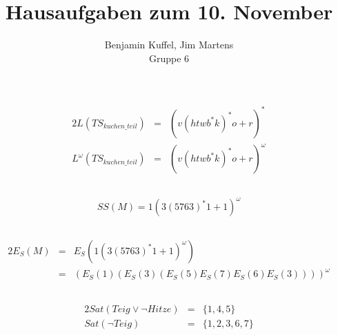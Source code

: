 \documentclass[10pt,a4paper,oneside,ngerman,numbers=noenddot]{scrartcl}
\begin{document}
\author{Benjamin Kuffel, Jim Martens\\Gruppe 6}
\title{Hausaufgaben zum 10. November}
\maketitle

\setcounter{section}{2}
\section{} %
	\subsection{}
	\begin{alignat*}{2}
		L(TS_{kuchen\_teil}) &=& (v(htwb^{*}k)^{*}o + r)^{*} \\
		L^{\omega}(TS_{kuchen\_teil}) &=& (v(htwb^{*}k)^{*}o + r)^{\omega}
	\end{alignat*}
	\subsection{}
	\[
		SS(M) = 1(3(5763)^{*}1 + 1)^{\omega}
	\]
	\subsection{}
	\begin{alignat*}{2}
		E_{S}(M) &=& E_{S}(1(3(5763)^{*}1 + 1)^{\omega}) \\
		         &=& (E_{S}(1)(E_{S}(3)(E_{S}(5)E_{S}(7)E_{S}(6)E_{S}(3))))^{\omega}
	\end{alignat*}
	\subsection{} %
	\begin{alignat*}{2}
		Sat(Teig \vee \lnot Hitze) &=& \{1, 4, 5\} \\
		Sat(\lnot Teig) &=& \{1, 2, 3, 6, 7\}
	\end{alignat*}	
	
	\subsection{} %
	
\end{document}
